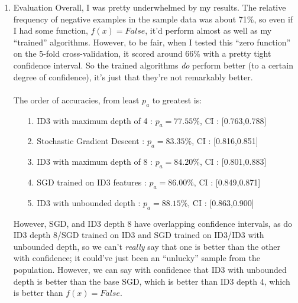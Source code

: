 \begin{enumerate}
\item Evaluation
      Overall, I was pretty underwhelmed by my results. The relative frequency of negative examples in the sample data was about 71\%, so even if I had some function, $f(x) = False$, it'd perform almost as well as my ``trained'' algorithms. However, to be fair, when I tested this ``zero function'' on the 5-fold cross-validation, it scored around 66\% with a pretty tight confidence interval. So the trained algorithms \textit{do} perform better (to a certain degree of confidence), it's just that they're not remarkably better.\\\\
      The order of accuracies, from least $p_a$ to greatest is:\\
      \begin{enumerate}
        \item[1.] 
                  ID3 with maximum depth of 4 : $p_a = 77.55\%$, CI : [0.763,0.788]
        \item[2.]
                  Stochastic Gradient Descent : $p_a = 83.35\%$, CI : [0.816,0.851]        
        \item[3.]
                  ID3 with maximum depth of 8 : $p_a = 84.20\%$, CI : [0.801,0.883]
        \item[4.]
                  SGD trained on ID3 features : $p_a = 86.00\%$, CI : [0.849,0.871]
        \item[5.]
                  ID3 with unbounded depth : $p_a = 88.15\%$, CI : [0.863,0.900]
      \end{enumerate}

      However, SGD, and ID3 depth 8 have overlapping confidence intervals, as do ID3 depth 8/SGD trained on ID3 and SGD trained on ID3/ID3 with unbounded depth, so we can't \textit{really} say that one is better than the other with confidence; it could've just been an ``unlucky'' sample from the population. However, we can say with confidence that ID3 with unbounded depth is better than the base SGD, which is better than ID3 depth 4, which is better than $f(x) = False$.\\
      
\end{enumerate}



